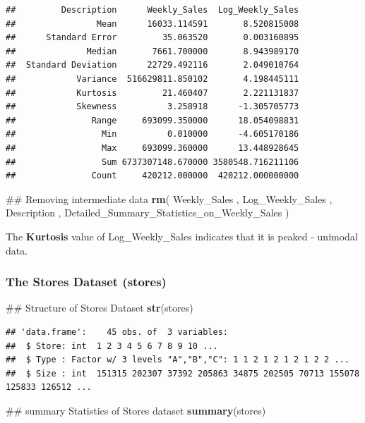 \documentclass[]{article}
\newenvironment{Shaded}{\begin{snugshade}}{\end{snugshade}}
\newcommand{\KeywordTok}[1]{\textcolor[rgb]{0.13,0.29,0.53}{\textbf{{#1}}}}
\newcommand{\NormalTok}[1]{{#1}}
\begin{document}
\begin{verbatim}
##         Description      Weekly_Sales  Log_Weekly_Sales
##                Mean      16033.114591       8.520815008
##      Standard Error         35.063520       0.003160895
##              Median       7661.700000       8.943989170
##  Standard Deviation      22729.492116       2.049010764
##            Variance  516629811.850102       4.198445111
##            Kurtosis         21.460407       2.221131837
##            Skewness          3.258918      -1.305705773
##               Range     693099.350000      18.054098831
##                 Min          0.010000      -4.605170186
##                 Max     693099.360000      13.448928645
##                 Sum 6737307148.670000 3580548.716211106
##               Count     420212.000000  420212.000000000
\end{verbatim}

\begin{Shaded}
\begin{Highlighting}[]
\NormalTok{## Removing intermediate data}
\KeywordTok{rm}\NormalTok{( }
  \NormalTok{Weekly_Sales ,  }
  \NormalTok{Log_Weekly_Sales , }
  \NormalTok{Description , }
  \NormalTok{Detailed_Summary_Statistics_on_Weekly_Sales )}
\end{Highlighting}
\end{Shaded}

The \textbf{Kurtosis} value of Log\_Weekly\_Sales indicates that it is
peaked - unimodal data.

\subsubsection{The Stores Dataset
(stores)}\label{the-stores-dataset-stores}

\begin{Shaded}
\begin{Highlighting}[]
\NormalTok{## Structure of Stores Dataset}
\KeywordTok{str}\NormalTok{(stores)}
\end{Highlighting}
\end{Shaded}

\begin{verbatim}
## 'data.frame':    45 obs. of  3 variables:
##  $ Store: int  1 2 3 4 5 6 7 8 9 10 ...
##  $ Type : Factor w/ 3 levels "A","B","C": 1 1 2 1 2 1 2 1 2 2 ...
##  $ Size : int  151315 202307 37392 205863 34875 202505 70713 155078 125833 126512 ...
\end{verbatim}

\begin{Shaded}
\begin{Highlighting}[]
\NormalTok{## summary Statistics of Stores dataset}
\KeywordTok{summary}\NormalTok{(stores)}
\end{Highlighting}
\end{Shaded}
\end{document}
